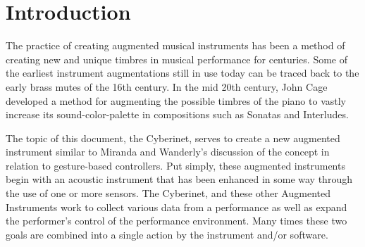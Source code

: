 \mainmatter


\chapter{Introduction}
\label{chap:intro}


The practice of creating augmented musical instruments has been a method of creating new and unique timbres in musical performance for centuries. Some of the earliest instrument augmentations still in use today can be traced back to the early brass mutes of the 16th century. In the mid 20th century, John Cage developed a method for augmenting the possible timbres of the piano to vastly increase its sound-color-palette in compositions such as Sonatas and Interludes. 

The topic of this document, the Cyberinet, serves to create a new augmented instrument similar to Miranda and Wanderly's discussion of the concept in relation to gesture-based controllers. %
Put simply, these augmented instruments begin with an acoustic instrument that has been enhanced in some way through the use of one or more sensors. The Cyberinet, and these other Augmented Instruments work to collect various data from a performance as well as expand the performer's control of the performance environment. Many times these two goals are combined into a single action by the instrument and/or software.


